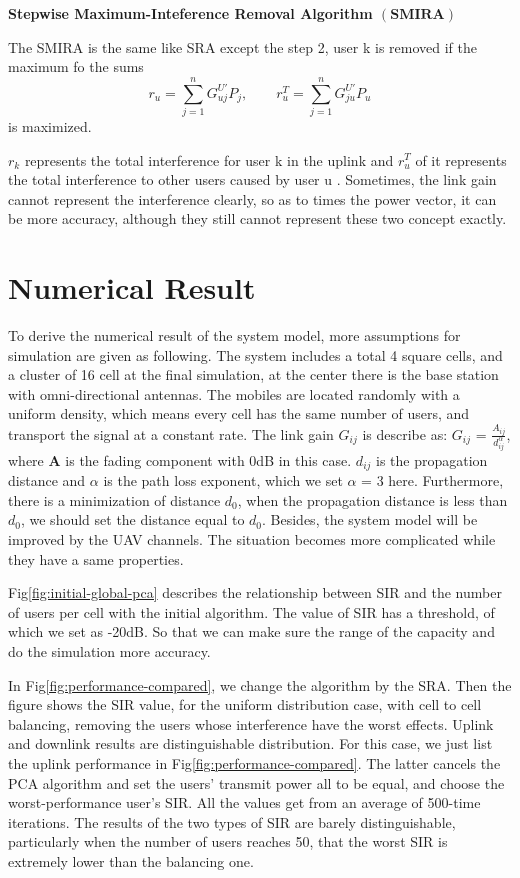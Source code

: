 \documentclass[conference]{IEEEtran}
\begin{document}
\textbf{Stepwise Maximum-Inteference Removal Algorithm $\left( \textbf{SMIRA} \right)$}  
          
The SMIRA is the same like SRA except the step 2, user k is removed if the maximum fo the sums 
\begin{equation}
r_u = \sum_{j=1}^{n}G^{U'}_{uj}P_j,\qquad r_u^{T} = \sum_{j=1}^{n}G^{U'}_{ju}P_u
\end{equation}
is maximized.

$r_k$ represents the total interference for user k in the uplink and $r_u^T$ of it represents the total interference to other users caused by user u \cite{wu1999performance}. Sometimes, the link gain cannot represent the interference clearly, so as to times the power vector, it can be more accuracy, although they still cannot represent these two concept exactly.  

\section{Numerical Result}
To derive the numerical result of the system model, more assumptions for simulation are given as following. The system includes a total 4 square cells, and a cluster of 16 cell at the final simulation, at the center there is the base station with omni-directional antennas. The mobiles are located randomly with a uniform density, which means every cell has the same number of users, and transport the signal at a constant rate. The link gain $G_{ij}$ is describe as: $G_{ij}$ = $\frac{A_{ij}}{d_{ij}^\alpha}$, where $\textbf{A}$ is the fading component with 0dB in this case. $d_{ij}$ is the propagation distance and $\alpha$ is the path loss exponent, which we set $\alpha$ = 3 here. Furthermore, there is a minimization of distance $d_0$, when the propagation distance is less than $d_0$, we should set the distance equal to $d_0$. Besides, the system model will be improved by the UAV channels. The situation becomes more complicated while they have a same properties. 

Fig\ref{fig:initial-global-pca} describes the relationship between SIR and the number of users per cell with the initial algorithm. The  value of SIR has a threshold, of which we set as -20dB. So that we can make sure the range of the capacity and do the simulation more accuracy. 

In Fig\ref{fig:performance-compared}, we change the algorithm by the SRA. Then the figure shows the SIR value, for the uniform distribution case, with cell to cell balancing, removing the users whose interference have the worst effects. Uplink and downlink results are distinguishable distribution. For this case, we just list the uplink performance in Fig\ref{fig:performance-compared}. The latter cancels the PCA algorithm and set the users' transmit power all to be equal, and choose the worst-performance user's SIR. All the values get from an average of 500-time iterations. The results of the two types of SIR are barely distinguishable, particularly when the number of users reaches 50, that the worst SIR is extremely lower than the balancing one. 
\end{document}
